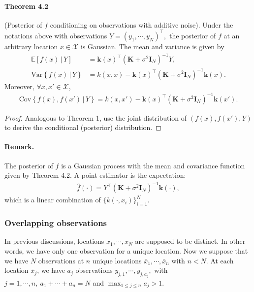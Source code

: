 \documentclass{article}
\begin{document}
\paragraph{Theorem 4.2} (Posterior of $f$ conditioning on observations with additive noise). Under the notations above with observations $Y=(y_1,\cdots,y_N)^\top,$ the posterior of $f$ at an arbitrary location $x\in\mathcal{X}$ is Gaussian. The mean and variance is given by
\begin{align*}
	\mathbb{E}\left[f(x)\,|\,Y\right] &= \mathbf{k}(x)^\top\left(\mathbf{K} + \sigma^2\mathbf{I}_{N}\right)^{-1} Y,\tag{4.11}\\
	\mathrm{Var}\left\lbrace f(x)\,|\,Y\right\rbrace &= k(x,x) - \mathbf{k}(x)^\top\left(\mathbf{K} + \sigma^2\mathbf{I}_{N}\right)^{-1}{\mathbf{k}}(x).\tag{4.12}
\end{align*}
Moreover, $\forall x,x'\in\mathcal{X}$,
\begin{align*}
	\mathrm{Cov}\left\lbrace f(x), f(x')\,|\,Y\right\rbrace = k(x,x') - \mathbf{k}(x)^\top\left(\mathbf{K} + \sigma^2\mathbf{I}_{N}\right)^{-1}{\mathbf{k}}(x').\tag{4.13}
\end{align*}
\begin{proof}
Analogous to Theorem 1, use the joint distribution of $\left(f(x),f(x'),Y\right)$ to derive the conditional (posterior) distribution. 
\end{proof} 
\paragraph{Remark.} The posterior of $f$ is a Gaussian process with the mean and covariance function given by Theorem 4.2. A point estimator is the expectation:
\begin{align*}
	\hat{f}(\cdot) = Y^\top(\mathbf{K}+\sigma^2\mathbf{I}_N)^{-1}\mathbf{k}(\cdot),\tag{4.14}
\end{align*}
which is a linear combination of $\lbrace k(\cdot,x_i)\rbrace_{i=1}^N.$

\subsubsection{Overlapping observations}
In previous discussions, locations $x_1,\cdots,x_N$ are supposed to be distinct. In other words, we have only one observation for a unique location. Now we suppose that we have $N$ observations at $n$ unique locations $\bar{x}_ 1,\cdots,\bar{x}_ n$ with $n < N.$ At each location $\bar{x}_ j$, we have $a_ j$ observations $y_ {j,1},\cdots,y_ {j,a_ j},$ with $j=1,\cdots,n,\ a_1+\cdots+a_n = N$ and $\max_{1\leq j\leq n} a_j > 1$.
\end{document}
